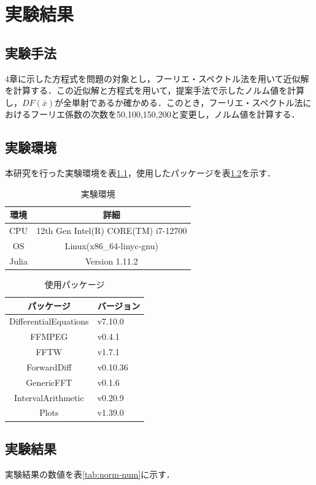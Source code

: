 \chapter{実験結果}
\section{実験手法}
4章に示した\vdp{}方程式を問題の対象とし，フーリエ・スペクトル法を用いて近似解を計算する．この近似解と\vdp{}方程式を用いて，提案手法で示したノルム値を計算し，$DF(\bar{x})$が全単射であるか確かめる．このとき，フーリエ・スペクトル法におけるフーリエ係数の次数を50,100,150,200と変更し，ノルム値を計算する．

\section{実験環境}
本研究を行った実験環境を表\ref{tab:環境}，使用したパッケージを表\ref{tab:パッケージ}を示す．

\begin{table}[h]
  \centering
  \caption{実験環境}
  \label{tab:環境}
  \begin{tabular}{c||c}
    環境 & 詳細 \\ \hline
    CPU & 12th Gen Intel(R) CORE(TM) i7-12700 \\
    OS & Linux(x86_64-linyc-gnu)\\
    Julia & Version 1.11.2
  \end{tabular}
\end{table}

\begin{table}[h]
  \centering
  \caption{使用パッケージ}
  \label{tab:パッケージ}
  \begin{tabular}{c||l}
    パッケージ & バージョン \\  \hline
    DifferentialEquations & v7.10.0 \\
    FFMPEG & v0.4.1 \\
    FFTW & v1.7.1 \\
    ForwardDiff & v0.10.36 \\
    GenericFFT & v0.1.6 \\
    IntervalArithmetic & v0.20.9 \\
    Plots & v1.39.0
  \end{tabular}
\end{table}

\section{実験結果}
実験結果の数値を表\ref{tab:norm-num}に示す．

